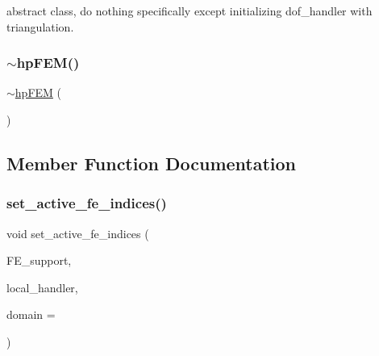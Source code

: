 abstract class, do nothing specifically except initializing dof\+\_\+handler with triangulation. \mbox{\label{classhp_f_e_m_acf426058508649734ee9618b5c9148c1}} 
\subsubsection{\texorpdfstring{$\sim$hpFEM()}{~hpFEM()}}
{\footnotesize\ttfamily $\sim$\mbox{\hyperlink{classhp_f_e_m}{hp\+F\+EM}} (\begin{DoxyParamCaption}{ }\end{DoxyParamCaption})}



\subsection{Member Function Documentation}
\mbox{\label{classhp_f_e_m_a12205240784051ad249a536cb7ee98d5}} 
\subsubsection{\texorpdfstring{set\_active\_fe\_indices()}{set\_active\_fe\_indices()}}
{\footnotesize\ttfamily void set\+\_\+active\+\_\+fe\+\_\+indices (\begin{DoxyParamCaption}\item[{std\+::vector$<$ std\+::vector$<$ int $>$ $>$ \&}]{F\+E\+\_\+support,  }\item[{hp\+::\+Do\+F\+Handler$<$ dim $>$ \&}]{local\+\_\+handler,  }\item[{int}]{domain = {} }\end{DoxyParamCaption})}

\mbox{\label{classhp_f_e_m_afe86b756fb757221f5a8a16c956b7e76}} 
